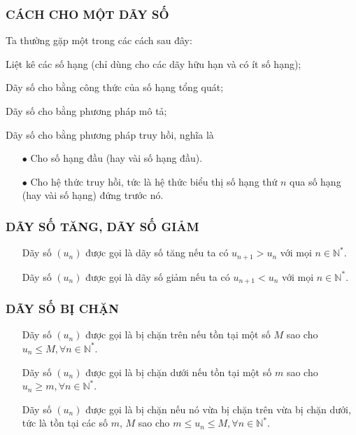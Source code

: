 \subsubsection{CÁCH CHO MỘT DÃY SỐ }
Ta thường gặp một trong các cách sau đây:
\begin{listEX}[1]
	\item [\ding{172}] Liệt kê các số hạng (chỉ dùng cho các dãy hữu hạn và có ít số hạng);
	\item [\ding{173}] Dãy số cho bằng công thức của số hạng tổng quát;
	\item [\ding{174}] Dãy số cho bằng phương pháp mô tả;
	\item [\ding{175}] Dãy số cho bằng phương pháp truy hồi, nghĩa là
		\begin{itemize}
			\item [$\bullet$] Cho số hạng đầu (hay vài số hạng đầu).
			\item [$\bullet$] Cho hệ thức truy hồi, tức là hệ thức biểu thị số hạng thứ $n$ qua số hạng (hay vài số hạng) đứng trước nó.
		\end{itemize}
\end{listEX}

\subsubsection{DÃY SỐ TĂNG, DÃY SỐ GIẢM}
\begin{itemize}
\item [\ding{172}] Dãy số $({{u}_n})$ được gọi là dãy số tăng nếu ta có ${{u}_{n+1}}>{{u}_n}$ với mọi $n\in \mathbb{N}^*$.
\item  [\ding{173}] Dãy số $({{u}_n} )$ được gọi là dãy số giảm nếu ta có ${{u}_{n+1}}<{{u}_n}$ với mọi $n\in \mathbb{N}^*$.
\end{itemize}

\subsubsection{DÃY SỐ BỊ CHẶN}

\begin{itemize}
\item [\ding{172}] Dãy số $({{u}_n} )$ được gọi là bị chặn trên nếu tồn tại một số $M$ sao cho ${{u}_n}\le M,\forall n\in \mathbb{N}^*$.
\item [\ding{173}] Dãy số $({{u}_n} )$ được gọi là bị chặn dưới nếu tồn tại một số $m$ sao cho
${{u}_n}\ge m,\forall n\in \mathbb{N}^*$.
\item [\ding{174}] Dãy số $({{u}_n} )$ được gọi là bị chặn nếu nó vừa bị chặn trên vừa bị chặn dưới, tức là tồn tại các số $m$, $M$ sao cho
$m\le {{u}_n}\le M,\forall n\in \mathbb{N}^*$.
\end{itemize}

